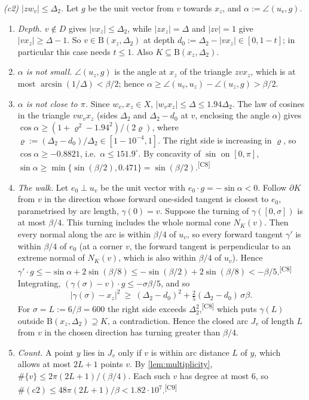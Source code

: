 \documentclass[11pt]{amsart}
\theoremstyle{definition}
\theoremstyle{remark}
\newcommand{\Dt}{\Delta_2}
\newcommand{\Dd}{\mathrm{B}}      %
\newcommand{\chk}[1]{\textsuperscript{[#1]}}
\begin{document}
\emph{(c2) $|zw_v|\le\Dt$.} Let $g$ be the unit vector from $v$ towards $x_z$, and $\alpha:=\angle(u_v,g)$.
\begin{enumerate}[leftmargin=2em,label=(\roman*)]
\item \emph{Depth.} $v\notin D$ gives $|vx_z|\le\Dt$, while $|zx_z|=\Delta$ and $|zv|=1$ give $|vx_z|\ge\Delta-1$. So $v\in\Dd(x_z,\Dt)$ at depth $d_0:=\Dt-|vx_z|\in[0,1-t]$; in particular this case needs $t\le 1$. Also $K\subseteq\Dd(x_z,\Dt)$.
\item \emph{$\alpha$ is not small.} $\angle(u_z,g)$ is the angle at $x_z$ of the triangle $zvx_z$, which is at most $\arcsin(1/\Delta)<\beta/2$; hence $\alpha\ge\angle(u_v,u_z)-\angle(u_z,g)>\beta/2$.
\item \emph{$\alpha$ is not close to $\pi$.} Since $w_v,x_z\in X$, $|w_vx_z|\le\Delta\le1.94\Dt$. The law of cosines in the triangle $vw_vx_z$ (sides $\Dt$ and $\Dt-d_0$ at $v$, enclosing the angle $\alpha$) gives $\cos\alpha\ge(1+\varrho^2-1.94^2)/(2\varrho)$, where $\varrho:=(\Dt-d_0)/\Dt\in[1-10^{-4},1]$. The right side is increasing in $\varrho$, so $\cos\alpha\ge-0.8821$, i.e.\ $\alpha\le151.9^\circ$. By concavity of $\sin$ on $[0,\pi]$, $\sin\alpha\ge\min\{\sin(\beta/2),0.471\}=\sin(\beta/2)$.\chk{C8}
\item \emph{The walk.} Let $e_0\perp u_v$ be the unit vector with $e_0\cdot g=-\sin\alpha<0$. Follow $\partial K$ from $v$ in the direction whose forward one-sided tangent is closest to $e_0$, parametrised by arc length, $\gamma(0)=v$. Suppose the turning of $\gamma([0,\sigma])$ is at most $\beta/4$. This turning includes the whole normal cone $N_K(v)$. Then every normal along the arc is within $\beta/4$ of $u_v$, so every forward tangent $\gamma'$ is within $\beta/4$ of $e_0$ (at a corner $v$, the forward tangent is perpendicular to an extreme normal of $N_K(v)$, which is also within $\beta/4$ of $u_v$). Hence $\gamma'\cdot g\le-\sin\alpha+2\sin(\beta/8)\le-\sin(\beta/2)+2\sin(\beta/8)<-\beta/5$.\chk{C8} Integrating, $(\gamma(\sigma)-v)\cdot g\le-\sigma\beta/5$, and so
\[
|\gamma(\sigma)-x_z|^2\ \ge\ (\Dt-d_0)^2+\tfrac25(\Dt-d_0)\,\sigma\beta .
\]
For $\sigma=L:=6/\beta=600$ the right side exceeds $\Dt^2$,\chk{C8} which puts $\gamma(L)$ outside $\Dd(x_z,\Dt)\supseteq K$, a contradiction. Hence the closed arc $J_v$ of length $L$ from $v$ in the chosen direction has turning greater than $\beta/4$.
\item \emph{Count.} A point $y$ lies in $J_v$ only if $v$ is within arc distance $L$ of $y$, which allows at most $2L+1$ points $v$. By \cref{lem:multiplicity}, $\#\{v\}\le 2\pi(2L+1)/(\beta/4)$. Each such $v$ has degree at most $6$, so $\#(\mathrm{c2})\le48\pi(2L+1)/\beta<1.82\cdot10^7$.\chk{C9}
\end{enumerate}
\end{document}
